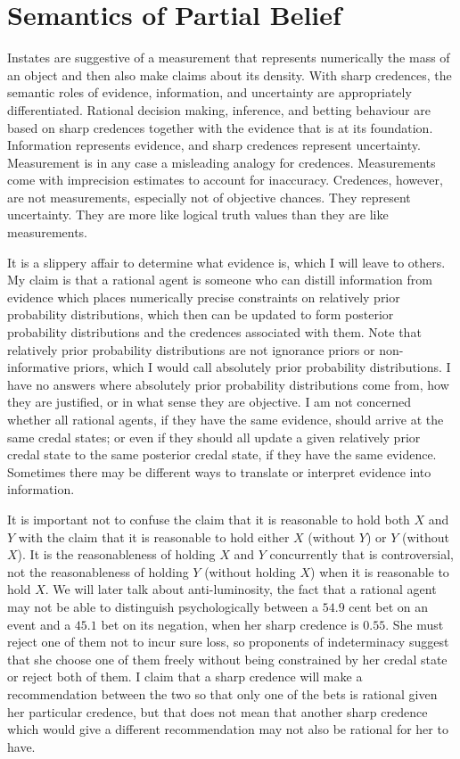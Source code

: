 \documentclass[11pt]{article}
\begin{document}
\section{Semantics of Partial Belief}
\label{SemanticsOfPartialBelief}

Instates are suggestive of a measurement that represents numerically
the mass of an object and then also make claims about its density.
With sharp credences, the semantic roles of evidence, information, and
uncertainty are appropriately differentiated. Rational decision
making, inference, and betting behaviour are based on sharp credences
together with the evidence that is at its foundation. Information
represents evidence, and sharp credences represent uncertainty.
Measurement is in any case a misleading analogy for credences.
Measurements come with imprecision estimates to account for
inaccuracy. Credences, however, are not measurements, especially not
of objective chances. They represent uncertainty. They are more like
logical truth values than they are like measurements.

It is a slippery affair to determine what evidence is,
which I will leave to others. My claim is that a rational agent is
someone who can distill information from evidence which places
numerically precise constraints on relatively prior probability
distributions, which then can be updated to form posterior probability
distributions and the credences associated with them. Note that
relatively prior probability distributions are not ignorance priors or
non-informative priors, which I would call absolutely prior
probability distributions. I have no answers where absolutely prior
probability distributions come from, how they are justified, or in
what sense they are objective. I am not concerned whether all rational
agents, if they have the same evidence, should arrive at the same
credal states; or even if they should all update a given relatively
prior credal state to the same posterior credal state, if they have
the same evidence. Sometimes there may be different ways to translate
or interpret evidence into information.

It is important not to confuse the claim that it is reasonable to hold
both $X$ and $Y$ with the claim that it is reasonable to hold either
$X$ (without $Y$) or $Y$ (without $X$). It is the reasonableness of
holding $X$ and $Y$ concurrently that is controversial, not the
reasonableness of holding $Y$ (without holding $X$) when it is
reasonable to hold $X$. We will later talk about anti-luminosity, the
fact that a rational agent may not be able to distinguish
psychologically between a $54.9$ cent bet on an event and a $45.1$ bet
on its negation, when her sharp credence is $0.55$. She must reject
one of them not to incur sure loss, so proponents of indeterminacy
suggest that she choose one of them freely without being constrained
by her credal state or reject both of them. I claim that a sharp
credence will make a recommendation between the two so that only one
of the bets is rational given her particular credence, but that does
not mean that another sharp credence which would give a different
recommendation may not also be rational for her to have.
\end{document}

